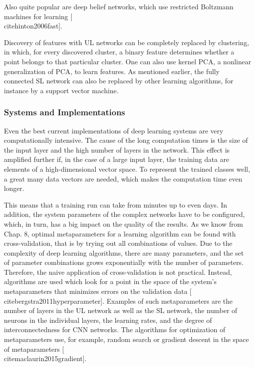 \documentclass[10pt]{book}
\begin{document}
Also quite popular are deep belief networks, which use restricted Boltzmann machines for learning [\\cite{hinton2006fast}].

Discovery of features with UL networks can be completely replaced by clustering, in which, for every discovered cluster, a binary feature determines whether a point belongs to that particular cluster. One can also use kernel PCA, a nonlinear generalization of PCA, to learn features. As mentioned earlier, the fully connected SL network can also be replaced by other learning algorithms, for instance by a support vector machine.

\subsubsection*{Systems and Implementations}
Even the best current implementations of deep learning systems are very computationally intensive. The cause of the long computation times is the size of the input layer and the high number of layers in the network. This effect is amplified further if, in the case of a large input layer, the training data are elements of a high-dimensional vector space. To represent the trained classes well, a great many data vectors are needed, which makes the computation time even longer.


This means that a training run can take from minutes up to even days. In addition, the system parameters of the complex networks have to be configured, which, in turn, has a big impact on the quality of the results. As we know from Chap. 8, optimal metaparameters for a learning algorithm can be found with cross-validation, that is by trying out all combinations of values. Due to the complexity of deep learning algorithms, there are many parameters, and the set of parameter combinations grows exponentially with the number of parameters. Therefore, the naive application of cross-validation is not practical. Instead, algorithms are used which look for a point in the space of the system's metaparameters that minimizes errors on the validation data [\\cite{bergstra2011hyperparameter}]. Examples of such metaparameters are the number of layers in the UL network as well as the SL network, the number of neurons in the individual layers, the learning rates, and the degree of interconnectedness for CNN networks. The algorithms for optimization of metaparameters use, for example, random search or gradient descent in the space of metaparameters [\\cite{maclaurin2015gradient}].
\end{document}
